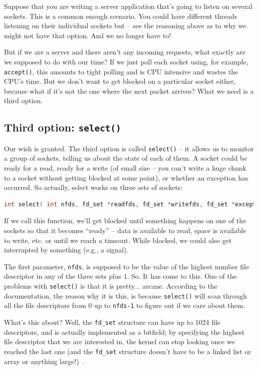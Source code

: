 \documentclass[a4paper]{report}
\begin{document}
Suppose that you are writing a server application that's going to listen on several sockets. This is a common enough scenario. You could have different threads listening on their individual sockets but -- see the reasoning above as to why we might not have that option. And we no longer have to!

But if we are a server and there aren't any incoming requests, what exactly are we supposed to do with our time? If we just poll each socket using, for example, \texttt{accept()}, this amounts to tight polling and is CPU intensive and wastes the CPU's time. But we don't want to get blocked on a particular socket either, because what if it's not the one where the next packet arrives? What we need is a third option.

\subsection*{Third option: \texttt{select()}} Our wish is granted. The third option is called \texttt{select()} -- it allows us to monitor a group of sockets, telling us about the state of each of them. A socket could be ready for a read, ready for a write (of small size -- you can't write a huge chunk to a socket without getting blocked at some point), or whether an exception has occurred. So actually, select works on three sets of sockets:

\begin{lstlisting}[language=C]
 int select( int nfds, fd_set *readfds, fd_set *writefds, fd_set *exceptfds, struct timeval *timeout );
\end{lstlisting}

If we call this function, we'll get blocked until something happens on one of the sockets so that it becomes ``ready'' -- data is available to read, space is available to write, etc. or until we reach a timeout. While blocked, we could also get interrupted by something (e.g., a signal).

The first parameter, \texttt{nfds}, is supposed to be the value of the highest number file descriptor in any of the three sets plus 1. So. It has come to this. One of the problems with \texttt{select()} is that it is pretty... arcane. According to the documentation, the reason why it is this, is because \texttt{select()} will scan through all the file descriptors from 0 up to \texttt{nfds-1} to figure out if we care about them.

What's this about? Well, the \texttt{fd\_set} structure can have up to 1024 file descriptors, and is actually implemented as a bitfield; by specifying the highest file descriptor that we are interested in, the kernel can stop looking once we reached the last one (and the \texttt{fd\_set} structure doesn't have to be a linked list or array or anything large!)~\cite{apunix}.
\end{document}
